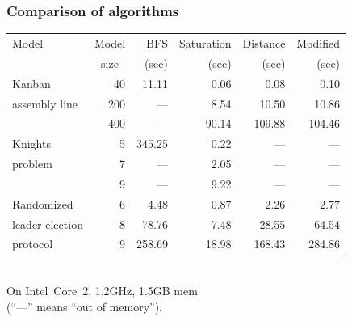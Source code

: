 \documentclass{beamer}
\begin{document}
\begin{frame}
  \frametitle{Comparison of algorithms}

  \vspace{-3.7mm}
  \begin{center}
    \begin{tabular}{|l|r||r|r|r|r|}
      \hline
      {\footnotesize Model} & \multicolumn{1}{|c||}{\footnotesize Model} & {\footnotesize BFS} & {\footnotesize Saturation} & {\footnotesize Distance} & {\footnotesize Modified} \\
      & \multicolumn{1}{|c||}{\footnotesize size}  & {\footnotesize (sec)}  & {\footnotesize (sec)}  & {\footnotesize (sec)} & {\footnotesize (sec)} \\
      \hline
      \hline
      {\footnotesize Kanban} & 40 & 11.11 & 0.06 & 0.08 & 0.10 \\
      {\footnotesize assembly line} & 200 & --- & 8.54 & 10.50 & 10.86 \\
      & 400 & --- & 90.14 & 109.88 & 104.46 \\
      \hline
      \hline
      {\footnotesize Knights} & 5 & 345.25 & 0.22 & --- & --- \\
      {\footnotesize problem} & 7 & --- & 2.05 & --- & --- \\
      & 9 & --- & 9.22 & --- & --- \\
      \hline
      \hline
      {\footnotesize Randomized} & 6 & 4.48 & 0.87 & 2.26 & 2.77 \\
      {\footnotesize leader election}     & 8 & 78.76 & 7.48 & 28.55 & 64.54 \\ 
      {\footnotesize protocol}     & 9 & 258.69 & 18.98 & 168.43 & 284.86 \\
      \hline
    \end{tabular}\\
    On Intel~Core~2, 1.2GHz, 1.5GB mem\\(``---'' means ``out of memory'').
  \end{center}

\end{frame}
\end{document}
